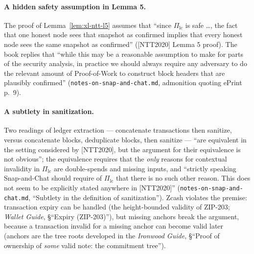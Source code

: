 \documentclass[11pt,a4paper]{article}
\theoremstyle{definition}
\begin{document}
\paragraph{A hidden safety assumption in Lemma 5.} The proof of
Lemma~\ref{lem:xl-ntt-l5} assumes that ``since $\Pi_{\mathrm{lc}}$ is safe
\dots, the fact that one honest node sees that snapshot as confirmed
implies that every honest node sees the same snapshot as confirmed''
([NTT2020] Lemma 5 proof). The book replies that ``while this may be a
reasonable assumption to make for parts of the security analysis, in
practice we should always require any adversary to do the relevant amount
of Proof-of-Work to construct block headers that are plausibly confirmed''
(\texttt{notes-on-snap-and-chat.md}, admonition quoting ePrint p.~9).

\paragraph{A subtlety in sanitization.} Two readings of ledger extraction
--- concatenate transactions then sanitize, versus concatenate blocks,
deduplicate blocks, then sanitize --- ``are equivalent in the setting
considered by [NTT2020], but the argument for their equivalence is not
obvious''; the equivalence requires that the \emph{only} reasons for
contextual invalidity in $\Pi_{\mathrm{lc}}$ are double-spends and missing
inputs, and ``strictly speaking Snap-and-Chat should require of
$\Pi_{\mathrm{lc}}$ that there is no such other reason. This does not seem
to be explicitly stated anywhere in [NTT2020]''
(\texttt{notes-on-snap-and-chat.md}, ``Subtlety in the definition of
sanitization''). Zcash violates the premise: transaction expiry can be
handled (the height-bounded validity of ZIP-203; \emph{Wallet Guide},
\S``Expiry (ZIP-203)''), but missing anchors break the argument, because
a transaction invalid for a missing anchor can become valid later
(anchors are the tree roots developed in the \emph{Ironwood Guide},
\S``Proof of ownership of \emph{some} valid note: the commitment tree'').
\end{document}
